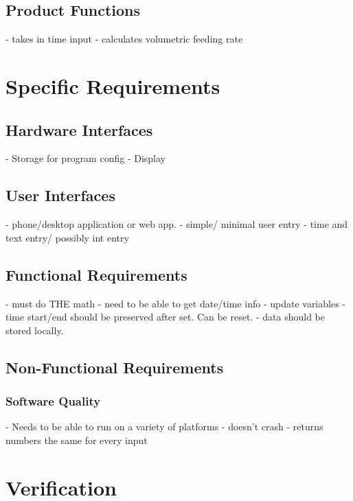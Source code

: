 \documentclass[10pt,draftclsnofoot,onecolumn]{IEEEtran}
\begin{document}
\subsection{Product Functions}
- takes in time input
- calculates volumetric feeding rate 

\section{Specific Requirements}
\subsection{Hardware Interfaces}
- Storage for program config
- Display

\subsection{User Interfaces}
- phone/desktop application or web app.
- simple/ minimal user entry
- time and text entry/ possibly int entry

\subsection{Functional Requirements}
- must do THE math
- need to be able to get date/time info
- update variables
- time start/end should be preserved after set. Can be reset.
- data should be stored locally.

\subsection{Non-Functional Requirements}
\subsubsection{}
\subsubsection{Software Quality}
- Needs to be able to run on a variety of platforms
- doesn't crash
- returns numbers the same for every input

\section{Verification}
\end{document}
